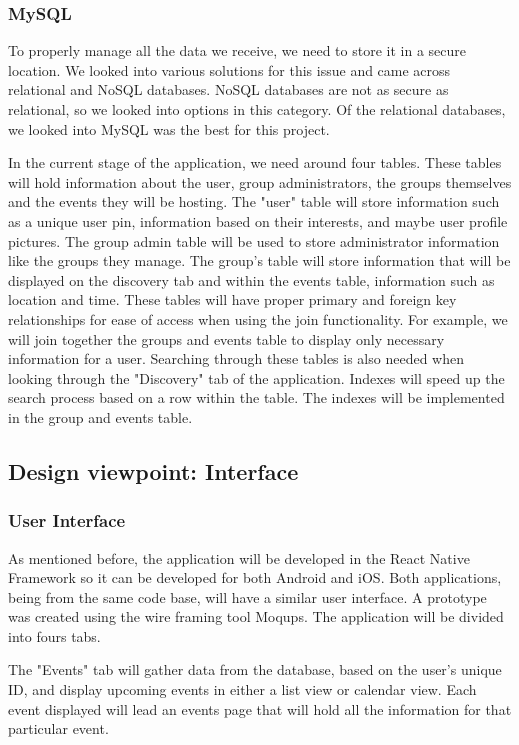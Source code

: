 \documentclass[letterpaper, 10pt,titlepage]{article}
\begin{document}
\subsubsection{MySQL}
To properly manage all the data we receive, we need to store it in a secure location. We looked into various solutions for this issue and came across relational and NoSQL databases. NoSQL databases are not as secure as relational, so we looked into options in this category. Of the relational databases, we looked into MySQL was the best for this project.

In the current stage of the application, we need around four tables. These tables will hold information about the user, group administrators, the groups themselves and the events they will be hosting. The "user" table will store information such as a unique user pin, information based on their interests, and maybe user profile pictures. The group admin table will be used to store administrator information like the groups they manage. The group's table will store information that will be displayed on the discovery tab and within the events table, information such as location and time. These tables will have proper primary and foreign key relationships for ease of access when using the join functionality. For example, we will join together the groups and events table to display only necessary information for a user. Searching through these tables is also needed when looking through the "Discovery" tab of the application. Indexes will speed up the search process based on a row within the table. The indexes will be implemented in the group and events table.
\subsection{Design viewpoint: Interface}

\subsubsection{User Interface}

As mentioned before, the application will be developed in the React Native Framework so it can be developed for both Android and iOS. Both applications, being from the same code base, will have a similar user interface. A prototype was created using the wire framing tool Moqups. The application will be divided into fours tabs.

The "Events" tab will gather data from the database, based on the user's unique ID, and display upcoming events in either a list view or calendar view. Each event displayed will lead an events page that will hold all the information for that particular event.
\end{document}
